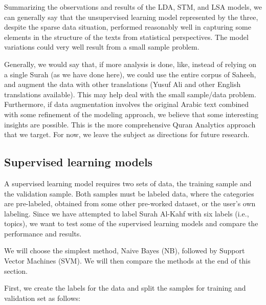 \documentclass[
]{article}
\begin{document}
Summarizing the observations and results of the LDA, STM, and LSA models, we can generally say that the unsupervised learning model represented by the three, despite the sparse data situation, performed reasonably well in capturing some elements in the structure of the texts from statistical perspectives. The model variations could very well result from a small sample problem.

Generally, we would say that, if more analysis is done, like, instead of relying on a single Surah (as we have done here), we could use the entire corpus of Saheeh, and augment the data with other translations (Yusuf Ali and other English translations available). This may help deal with the small sample/data problem. Furthermore, if data augmentation involves the original Arabic text combined with some refinement of the modeling approach, we believe that some interesting insights are possible. This is the more comprehensive Quran Analytics approach that we target. For now, we leave the subject as directions for future research.

\hypertarget{supervised-learning-models}{%
\subsection{Supervised learning models}\label{supervised-learning-models}}

A supervised learning model requires two sets of data, the training sample and the validation sample. Both samples must be labeled data, where the categories are pre-labeled, obtained from some other pre-worked dataset, or the user's own labeling. Since we have attempted to label Surah Al-Kahf with six labels (i.e., topics), we want to test some of the supervised learning models and compare the performance and results.

We will choose the simplest method, Naive Bayes (NB), followed by Support Vector Machines (SVM). We will then compare the methods at the end of this section.

First, we create the labels for the data and split the samples for training and validation set as follows:

\footnotesize
\end{document}
